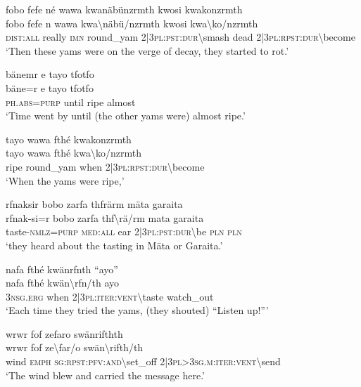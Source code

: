 \ea\label{ex:1:a3816}
fobo fefe né wawa kwanäbünzrmth kwosi kwakonzrmth\\
\gll fobo	fefe	n	wawa	kwa{\textbackslash}näbü/nzrmth	kwosi	kwa{\textbackslash}ko/nzrmth\\
     \textsc{dist}:\textsc{all}	really	\textsc{imn}	round\_yam	2|3\textsc{pl}:\textsc{pst}:\textsc{dur}{\textbackslash}smash	dead	2|3\textsc{pl}:\textsc{rpst}:\textsc{dur}{\textbackslash}become\\
\glt `Then these yams were on the verge of decay, they started to rot.'
\z

\ea\label{ex:1:a3818}
bänemr e tayo tfotfo\\
\gll bäne=r	e	tayo	tfotfo\\
     \textsc{ph}.\textsc{abs}=\textsc{purp}	until	ripe	almost\\
\glt `Time went by until (the other yams were) almost ripe.'
\z

\ea\label{ex:1:a3820}
tayo wawa fthé kwakonzrmth\\
\gll tayo	wawa	fthé	kwa{\textbackslash}ko/nzrmth\\
     ripe	round\_yam	when	2|3\textsc{pl}:\textsc{rpst}:\textsc{dur}{\textbackslash}become\\
\glt `When the yams were ripe,'
\z

\ea\label{ex:1:a3821}
rfnaksir bobo zarfa thfrärm mäta garaita\\
\gll rfnak-si=r	bobo	zarfa	thf{\textbackslash}rä/rm	mata	garaita\\
     taste-\textsc{nmlz}=\textsc{purp}	\textsc{med}:\textsc{all}	ear	2|3\textsc{pl}:\textsc{pst}:\textsc{dur}{\textbackslash}be	\textsc{pln}	\textsc{pln}\\
\glt `they heard about the tasting in Mäta or Garaita.'
\z

\ea\label{ex:1:a3823}
nafa fthé kwänrfnth ``ayo''\\
\gll nafa	fthé	kwän{\textbackslash}rfn/th	ayo\\
     3\textsc{nsg}.\textsc{erg}	when	2|3\textsc{pl}:\textsc{iter}:\textsc{vent}{\textbackslash}taste	watch\_out\\
\glt `Each time they tried the yams, (they shouted) ``Listen up!'''
\z

\ea\label{ex:1:a3825}
wrwr fof zefaro swänrifthth\\
\gll wrwr	fof	ze{\textbackslash}far/o	swän{\textbackslash}rifth/th\\
     wind	\textsc{emph}	\textsc{sg}:\textsc{rpst}:\textsc{pfv}:\textsc{and}{\textbackslash}set\_off	2|3\textsc{pl}>3\textsc{sg}.\textsc{m}:\textsc{iter}:\textsc{vent}{\textbackslash}send\\
\glt `The wind blew and carried the message here.'
\z

